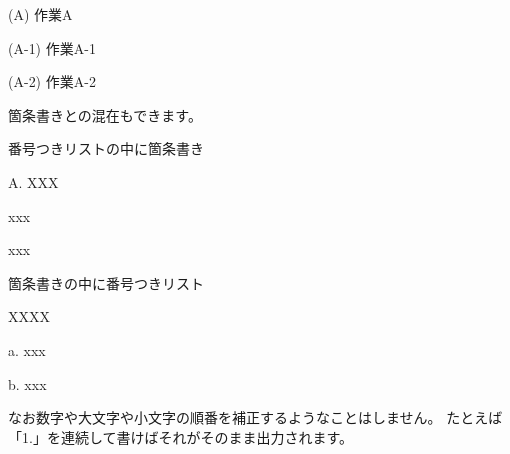 \starterresult

\begin{starterenumerate}
\item[(A)] 作業A

\begin{starterenumerate}
\item[(A{-}1)] 作業A{-}1
\item[(A{-}2)] 作業A{-}2
\end{starterenumerate}

\end{starterenumerate}

\endstarterresult

箇条書きとの混在もできます。

\begin{starterprogram}\end{starterprogram}
\noindent
{}

\starterresult

番号つきリストの中に箇条書き

\begin{starterenumerate}
\item[A.] XXX

\begin{starteritemize}
\item xxx
\item xxx
\end{starteritemize}

\end{starterenumerate}

箇条書きの中に番号つきリスト

\begin{starteritemize}
\item XXXX

\begin{starterenumerate}
\item[a.] xxx
\item[b.] xxx
\end{starterenumerate}

\end{starteritemize}

\endstarterresult

なお数字や大文字や小文字の順番を補正するようなことはしません。
たとえば「1.」を連続して書けばそれがそのまま出力されます。

